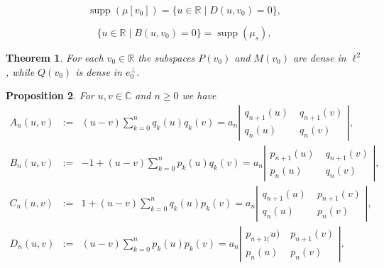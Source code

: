 \documentclass[10pt,a4paper]{amsart}
\newtheorem{thm}{Theorem}[section]
\newtheorem{prop}[thm]{Proposition}
\DeclareMathOperator{\supp}{supp}
\newcommand{\C}{\mathbb{C}}
\newcommand{\R}{\mathbb{R}}
\def\ph{\phantom{-}}
\def\p{\ph}
\begin{document}
\setcounter{section}{1}
\setcounter{equation}{17}
\setcounter{thm}{2}
\begin{equation}\label{eq:supp}
\supp(\mu[v_0])=\{u\in\R \mid D(u,v_0)=0\},
\end{equation}

\setcounter{section}{1}
\setcounter{equation}{20}
\setcounter{thm}{2}
\begin{equation}\label{eq:N-ext2}
\{u\in\R \mid B(u,v_0)=0\}=\supp(\mu_s),
\end{equation}

\setcounter{section}{1}
\setcounter{equation}{21}
\setcounter{thm}{2}
  \begin{thm}\label{thm:concrete} For each $v_0\in\R$ the subspaces $P(v_0)$ and $M(v_0)$ are dense in $\ell^2$, while $Q(v_0)$ is dense in $e_0^\perp$.
\end{thm}

\setcounter{section}{2}
\setcounter{equation}{0}
\setcounter{thm}{0}
\begin{prop}\cite[Proposition 5.24]{Sch}\label{thm:An-Dn} For $u,v\in\C$ and $n\ge 0$ we have
\begin{eqnarray*}
A_n(u,v)&:=&(u-v)\sum_{k=0}^nq_k(u)q_k(v)=
a_n\left|\begin{array}{cc}
 q_{n+1}(u)&\;q_{n+1}(v)\\q_{n}(u)&\;q_{n}(v)\end{array}\right|,\\
B_n(u,v)&:=&-1+(u-v)\sum_{k=0}^n p_k(u)q_k(v)=
a_n\left|\begin{array}{cc}
p_{n+1}(u)&\;q_{n+1}(v)\\p_{n}(u)&\;q_{n}(v)\end{array}\right|,\\
C_n(u,v)&:=&1+(u-v)\sum_{k=0}^n q_k(u)p_k(v)=
a_n\left|\begin{array}{cc}
q_{n+1}(u)&\;p_{n+1}(v)\\
q_{n}(u)&\;p_{n}(v)\end{array}\right|,\\
D_n(u,v)&:=&(u-v)\sum_{k=0}^np_k(u)p_k(v)=
a_n\left|\begin{array}{cc}
p_{n+1(}u)&\;p_{n+1}(v)\\
p_{n}(u)&\;p_{n}(v)\end{array}\right|.
\end{eqnarray*}
\end{prop}
\end{document}
